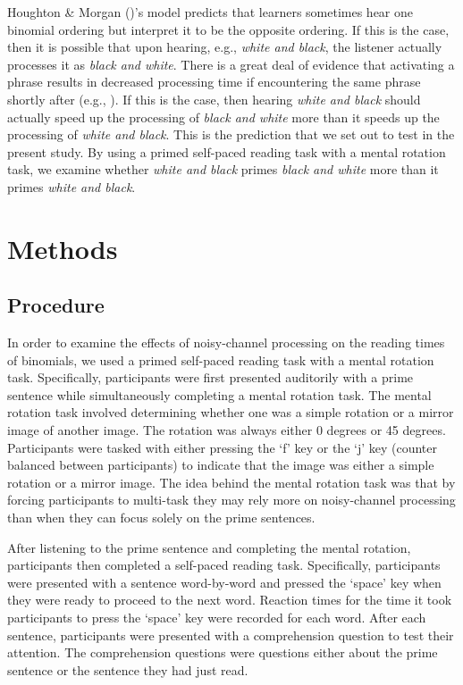 \documentclass[
  12pt,
]{scrartcl}
\begin{document}
Houghton \& Morgan
()'s
model predicts that learners sometimes hear one binomial ordering but
interpret it to be the opposite ordering. If this is the case, then it
is possible that upon hearing, e.g., \emph{white and black}, the
listener actually processes it as \emph{black and white}. There is a
great deal of evidence that activating a phrase results in decreased
processing time if encountering the same phrase shortly after (e.g.,
). If this is the case, then hearing \emph{white and
black} should actually speed up the processing of \emph{black and white}
more than it speeds up the processing of \emph{white and black}. This is
the prediction that we set out to test in the present study. By using a
primed self-paced reading task with a mental rotation task, we examine
whether \emph{white and black} primes \emph{black and white} more than
it primes \emph{white and black}.

\section{Methods}\label{methods}

\subsection{Procedure}\label{procedure}

In order to examine the effects of noisy-channel processing on the
reading times of binomials, we used a primed self-paced reading task
with a mental rotation task. Specifically, participants were first
presented auditorily with a prime sentence while simultaneously
completing a mental rotation task. The mental rotation task involved
determining whether one was a simple rotation or a mirror image of
another image. The rotation was always either 0 degrees or 45 degrees.
Participants were tasked with either pressing the `f' key or the `j' key
(counter balanced between participants) to indicate that the image was
either a simple rotation or a mirror image. The idea behind the mental
rotation task was that by forcing participants to multi-task they may
rely more on noisy-channel processing than when they can focus solely on
the prime sentences.

After listening to the prime sentence and completing the mental
rotation, participants then completed a self-paced reading task.
Specifically, participants were presented with a sentence word-by-word
and pressed the `space' key when they were ready to proceed to the next
word. Reaction times for the time it took participants to press the
`space' key were recorded for each word. After each sentence,
participants were presented with a comprehension question to test their
attention. The comprehension questions were questions either about the
prime sentence or the sentence they had just read.
\end{document}
